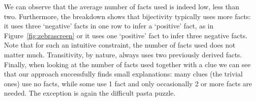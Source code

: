 We can observe that the average number of facts used is indeed low, less than two. Furthermore, the breakdown shows that bijectivity typically uses more facts: it uses three `negative' facts in one row to infer a `positive' fact, as in Figure~\ref{fig:zebrascreen} or it uses one `positive' fact to infer three negative facts. Note that for such an intuitive constraint, the number of facts used does not matter much. Transitivity, by nature, always uses two previously derived facts. Finally, when looking at the number of facts used together with a clue we can see that our approach successfully finds small explanations: many clues (the trivial ones) use no facts, while some use 1 fact and only occasionally 2 or more facts are needed. The exception is again the difficult pasta puzzle.







